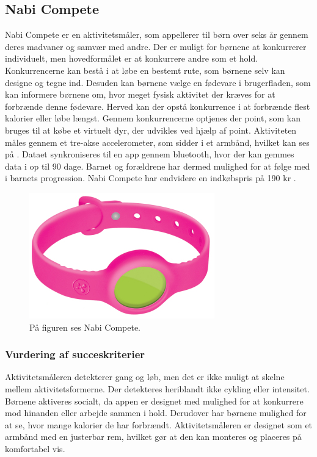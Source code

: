 \subsection{Nabi Compete}
Nabi Compete er en aktivitetsmåler, som appellerer til børn over seks år gennem deres madvaner og samvær med andre. Der er muligt for børnene at konkurrerer individuelt, men hovedformålet er at konkurrere andre som et hold. Konkurrencerne kan bestå i at løbe en bestemt rute, som børnene selv kan designe og tegne ind. Desuden kan børnene vælge en fødevare i brugerfladen, som kan informere børnene om, hvor meget fysisk aktivitet der kræves for at forbrænde denne fødevare. Herved kan der opstå konkurrence i at forbrænde flest kalorier eller løbe længst. %
 Gennem konkurrencerne optjenes der point, som kan bruges til at købe et virtuelt dyr, der udvikles ved hjælp af point. 
Aktiviteten måles gennem et tre-akse accelerometer, som sidder i et armbånd, hvilket kan ses på . Dataet synkroniseres til en app gennem bluetooth, hvor der kan gemmes data i op til 90 dage. Barnet og forældrene har dermed mulighed for at følge med i barnets progression. 
Nabi Compete har endvidere en indkøbspris på 190 kr \citep{Fuhu2015,Fuhu_tech2015}. 

\begin{figure}[H]
	\centering
	\includegraphics[scale=0.8]{figures/aProblemanalyse/nabi.png}
	\caption{På figuren ses Nabi Compete. \citep{Perez2015}}
	\label{fig:nabi}
\end{figure}

\subsubsection{Vurdering af succeskriterier}
Aktivitetsmåleren detekterer gang og løb, men det er ikke muligt at skelne mellem aktivitetsformerne. Der detekteres heriblandt ikke cykling eller intensitet. Børnene aktiveres socialt, da appen er designet med mulighed for at konkurrere mod hinanden eller arbejde sammen i hold. Derudover har børnene mulighed for %
at se, hvor mange kalorier de har forbrændt. Aktivitetsmåleren er designet som et armbånd med en justerbar rem, hvilket gør at den kan monteres og placeres på komfortabel vis.~\citep{Fuhu2015,Fuhu_tech2015}

